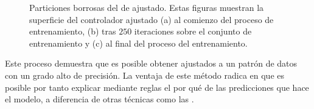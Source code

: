\begin{figure}
	\centering
	\qquad
	\qquad
	\caption[Evolución del  de acuerdo al conjunto de datos extraido del ]{Particiones borrosas del  de ajustado. Estas figuras muestran la superficie del controlador ajustado (a) al comienzo del proceso de entrenamiento, (b) tras $250$ iteraciones sobre el conjunto de entrenamiento y (c) al final del proceso del entrenamiento.}
	\label{fig:adjusted-tip-controller-training}
\end{figure}

Este proceso demuestra que es posible obtener  ajustados a un patrón de datos con un grado alto de precisión. La ventaja de este método radica en que es posible por tanto explicar mediante reglas el por qué de las predicciones que hace el modelo, a diferencia de otras técnicas como las .